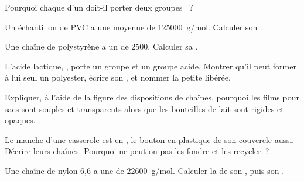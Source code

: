 \begin{exercise}[$\star$]\label{exo:g12:polymers:5}
Pourquoi chaque  d'un  doit-il porter
deux groupes ~?
\end{exercise}

\begin{exercise}[$\star\star$]\label{exo:g12:polymers:6}
Un échantillon de PVC a une  moyenne de
\qty{125000}{g/mol}. Calculer son .
\end{exercise}

\begin{exercise}[$\star\star$]\label{exo:g12:polymers:7}
Une chaîne de polystyrène a un  de 2500.
Calculer sa .
\end{exercise}

\begin{exercise}[$\star\star$]\label{exo:g12:polymers:8}
L'acide lactique, , porte un groupe  et un
groupe acide. Montrer qu'il peut former à lui seul un polyester, écrire
son , et nommer la petite  libérée.
\end{exercise}

\begin{exercise}[$\star\star$]\label{exo:g12:polymers:9}
Expliquer, à l'aide de la figure des dispositions de chaînes, pourquoi
les films pour sacs sont souples et transparents alors que les
bouteilles de lait sont rigides et opaques.
\end{exercise}

\begin{exercise}[$\star\star$]\label{exo:g12:polymers:10}
Le manche d'une casserole est en , le bouton en
plastique de son couvercle aussi. Décrire leurs chaînes. Pourquoi ne
peut-on pas les fondre et les recycler~?
\end{exercise}

\begin{exercise}[$\star\star$]\label{exo:g12:polymers:11}
Une chaîne de nylon-6,6 a une  de \qty{22600}{g/mol}.
Calculer la  de son  , puis son .
\end{exercise}

